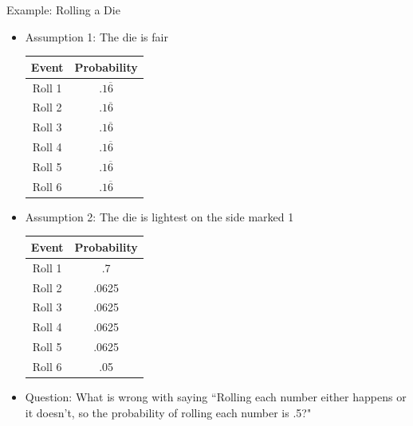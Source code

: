 \documentclass{beamer}
\begin{document}
\begin{frame}[shrink]{Example: Rolling a Die}

    \begin{itemize}
        \item Assumption 1: The die is fair

        \begin{table}[h]
        \small
        \centering
        \begin{tabular}{|c|c|}
        \hline
        Event & Probability \\
        \hline
        Roll 1 & $.1\overline{6}$ \\
        \hline
        Roll 2 & $.1\overline{6}$ \\
        \hline
        Roll 3 & $.1\overline{6}$ \\
        \hline
        Roll 4 & $.1\overline{6}$ \\
        \hline
        Roll 5 & $.1\overline{6}$ \\
        \hline 
        Roll 6 & $.1\overline{6}$ \\
        \hline
        \end{tabular}
        \end{table}

        \item<2-> Assumption 2: The die is lightest on the side marked 1

        \begin{table}[h]
        \small  
        \centering
        \begin{tabular}{|c|c|}
        \hline
        Event & Probability \\
        \hline
        Roll 1 & .7 \\
        \hline
        Roll 2 & .0625 \\
        \hline
        Roll 3 & .0625 \\
        \hline
        Roll 4 & .0625 \\
        \hline
        Roll 5 & .0625 \\
        \hline 
        Roll 6 & .05 \\
        \hline
        \end{tabular}
        \end{table}

        \item<3-> Question: What is wrong with saying ``Rolling each number either happens or it doesn't, so the probability of rolling each number is .5?"
    
    \end{itemize}
\end{frame}
\end{document}
